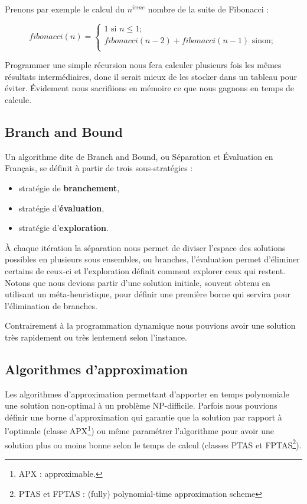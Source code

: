 Prenons par exemple le calcul du $n^{i\grave{e}me}$ nombre de la suite de Fibonacci :

\begin{equation}
fibonacci(n) = 
\begin{cases}
1 \text{ si } n \leq 1; \\
fibonacci(n-2) + fibonacci(n-1) \text{ sinon};\\
\end{cases}
\end{equation}

Programmer une simple récursion nous fera calculer plusieurs fois les mêmes résultats intermédiaires, donc il serait mieux de les stocker dans un tableau pour éviter. Évidement  nous sacrifiions en mémoire ce que nous gagnons en temps de calcule.


\subsection{Branch and Bound}
Un algorithme dite de Branch and Bound, ou Séparation et Évaluation en Français, se définit à partir de trois sous-stratégies :

\begin{itemize}
\item stratégie de \textbf{branchement},
\item stratégie d'\textbf{évaluation},
\item stratégie d'\textbf{exploration}.
\end{itemize}

À chaque itération la séparation nous permet de diviser l'espace des solutions possibles en plusieurs sous ensembles, ou branches, l'évaluation permet d'éliminer certains de ceux-ci et l'exploration définit comment explorer ceux qui restent. Notons que nous devions partir d'une solution initiale, souvent obtenu en utilisant un méta-heuristique, pour définir une première borne qui servira pour l'élimination de branches. 

Contrairement à la programmation dynamique nous pouvions avoir une solution très rapidement ou très lentement selon l'instance. 

\subsection{Algorithmes d'approximation}
Les algorithmes d'approximation permettant d'apporter en temps polynomiale une
solution non-optimal à un problème NP-difficile. Parfois nous pouvions définir une borne d'approximation qui garantie que la solution par rapport à l'optimale (classe APX\footnote{APX : approximable. }) ou même paramétrer l'algorithme pour avoir une solution plus ou moins bonne selon le temps de calcul (classes PTAS et FPTAS\footnote{ PTAS et FPTAS : (fully) polynomial-time approximation scheme}).  
